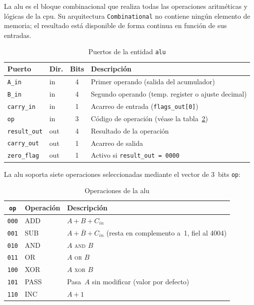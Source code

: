 \documentclass[%
    school=etsisi,%
    type=pfg,%
    degree=61CI,%
]{upm-report}
\begin{document}
La \acrfull{alu} es el bloque combinacional que realiza todas las operaciones
aritméticas y lógicas de la \acrshort{cpu}.  Su arquitectura
\texttt{Combinational} no contiene ningún elemento de memoria; el resultado
está disponible de forma continua en función de sus entradas.

\begin{table}[H]
\centering
\caption{Puertos de la entidad \texttt{alu}}
\label{tab:alu}
\begin{tabularx}{\textwidth}{@{}llcX@{}}
\toprule
\textbf{Puerto}   & \textbf{Dir.} & \textbf{Bits} & \textbf{Descripción} \\
\midrule
\texttt{A\_in}      & in  & 4 & Primer operando (salida del acumulador) \\
\texttt{B\_in}      & in  & 4 & Segundo operando (temp. register o ajuste decimal) \\
\texttt{carry\_in}  & in  & 1 & Acarreo de entrada (\texttt{flags\_out[0]}) \\
\texttt{op}         & in  & 3 & Código de operación (véase la tabla~\ref{tab:alu-ops}) \\
\texttt{result\_out}& out & 4 & Resultado de la operación \\
\texttt{carry\_out} & out & 1 & Acarreo de salida \\
\texttt{zero\_flag} & out & 1 & Activo si \texttt{result\_out = 0000} \\
\bottomrule
\end{tabularx}
\end{table}

La \acrshort{alu} soporta siete operaciones seleccionadas mediante el vector
de 3~bits \texttt{op}:

\begin{table}[H]
\centering
\caption{Operaciones de la \acrshort{alu}}
\label{tab:alu-ops}
\begin{tabularx}{\textwidth}{@{}clX@{}}
\toprule
\textbf{\texttt{op}} & \textbf{Operación} & \textbf{Descripción} \\
\midrule
\texttt{000} & ADD  & $A + B + C_{in}$ \\
\texttt{001} & SUB  & $A + \overline{B} + C_{in}$ (resta en complemento a~1, fiel al 4004) \\
\texttt{010} & AND  & $A$ \textsc{and} $B$ \\
\texttt{011} & OR   & $A$ \textsc{or} $B$ \\
\texttt{100} & XOR  & $A$ \textsc{xor} $B$ \\
\texttt{101} & PASS & Pasa~$A$ sin modificar (valor por defecto) \\
\texttt{110} & INC  & $A + 1$ \\
\bottomrule
\end{tabularx}
\end{table}
\end{document}
